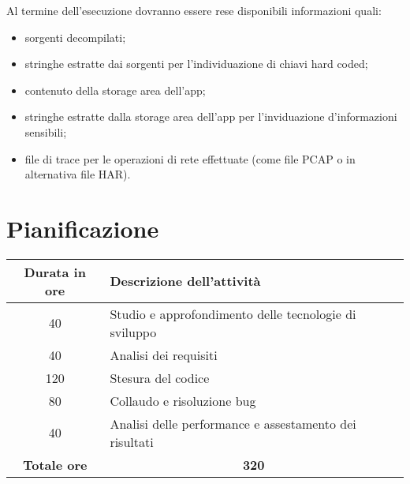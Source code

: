 Al termine dell'esecuzione dovranno essere rese disponibili informazioni quali:
\begin{itemize}
    \setlength\itemsep{0.1em}
    \item sorgenti decompilati;
    \item stringhe estratte dai sorgenti per l'individuazione di chiavi hard coded;
    \item contenuto della storage area dell'app;
    \item stringhe estratte dalla storage area dell'app per l'inviduazione d'informazioni sensibili;
    \item file di trace per le operazioni di rete effettuate (come file PCAP o in alternativa file HAR).
\end{itemize}

\section{Pianificazione}\label{sec:pianificazione}
\begin{tabularx}{\textwidth}{|c|X|}
    \hline
    \textbf{Durata in ore} & \textbf{Descrizione dell'attività} \\\hline
    40 & Studio e approfondimento delle tecnologie di sviluppo \\\hline
    40 & Analisi dei requisiti \\\hline
    120 & Stesura del codice \\\hline
    80 & Collaudo e risoluzione bug \\\hline
    40 & Analisi delle performance e assestamento dei risultati \\\hline
    \textbf{Totale ore} & \multicolumn{1}{|c|}{\textbf{320}} \\\hline
\end{tabularx}